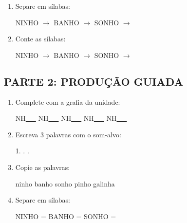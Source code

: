 \begin{exercicio}
\begin{enumerate}
  \item Separe em sílabas:
  \begin{center}
  NINHO $\rightarrow$ \underline{\hspace{1cm}} \quad BANHO $\rightarrow$ \underline{\hspace{1cm}} \quad SONHO $\rightarrow$ \underline{\hspace{1cm}}
  \end{center}

  \item Conte as sílabas:
  \begin{center}
  NINHO $\rightarrow$ \underline{\hspace{0.9cm}} \quad BANHO $\rightarrow$ \underline{\hspace{0.9cm}} \quad SONHO $\rightarrow$ \underline{\hspace{0.9cm}}
  \end{center}

\end{enumerate}

\subsection*{PARTE 2: PRODUÇÃO GUIADA}

\begin{enumerate}[resume]

  \item Complete com a grafia da unidade:
  \begin{center}
  NH\underline{~~~} \quad NH\underline{~~~} \quad NH\underline{~~~} \quad NH\underline{~~~} \quad NH\underline{~~~}
  \end{center}

  \item Escreva 3 palavras com o som-alvo:
  \begin{center}
  1. \underline{\hspace{3cm}} . \underline{\hspace{3cm}} . \underline{\hspace{3cm}}
  \end{center}

  \item Copie as palavras:
  \begin{center}
  ninho \quad banho \quad sonho \quad pinho \quad galinha
  \end{center}

  \item Separe em sílabas:
  \begin{center}
  NINHO = \underline{\hspace{1cm}} \underline{\hspace{1cm}} \quad BANHO = \underline{\hspace{1cm}} \underline{\hspace{1cm}} \quad SONHO = \underline{\hspace{1cm}} \underline{\hspace{1cm}}
  \end{center}


\end{enumerate}
\end{exercicio}
